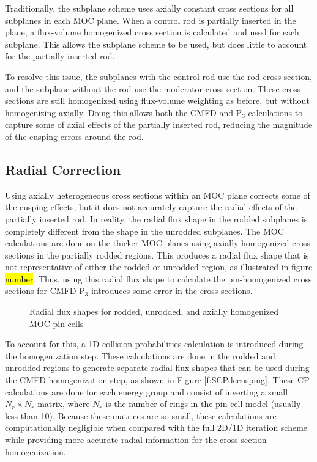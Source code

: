Traditionally, the subplane scheme uses axially constant cross sections for all subplanes in each MOC plane.  When a control rod is partially inserted in the plane, a flux-volume homogenized cross section is calculated and used for each subplane.  This allows the subplane scheme to be used, but does little to account for the partially inserted rod.

To resolve this issue, the subplanes with the control rod use the rod cross section, and the subplane without the rod use the moderator cross section.  These cross sections are still homogenized using flux-volume weighting as before, but without homogenizing axially.  Doing this allows both the CMFD and P$_3$ calculations to capture some of axial effects of the partially inserted rod, reducing the magnitude of the cusping errors around the rod.

\subsection{Radial Correction}

Using axially heterogeneous cross sections within an MOC plane corrects some of the cusping effects, but it does not accurately capture the radial effects of the partially inserted rod.  In reality, the radial flux shape in the rodded subplanes is completely different from the shape in the unrodded subplanes.  The MOC calculations are done on the thicker MOC planes using axially homogenized cross sections in the partially rodded regions.  This produces a radial flux shape that is not representative of either the rodded or unrodded region, as illustrated in figure \hl{number}.  Thus, using this radial flux shape to calculate the pin-homogenized cross sections for CMFD P$_3$ introduces some error in the cross sections.

\begin{figure}
    \centering
    \caption{Radial flux shapes for rodded, unrodded, and axially homogenized MOC pin cells}\label{f:radialFluxProfiles}
\end{figure}

To account for this, a 1D collision probabilities calculation is introduced during the homogenization step.  These calculations are done in the rodded and unrodded regions to generate separate radial flux shapes that can be used during the CMFD homogenization step, as shown in Figure \ref{f:SCPdecusping}.  These CP calculations are done for each energy group and consist of inverting a small $N_r \times N_r$ matrix, where $N_r$ is the number of rings in the pin cell model (usually less than 10).  Because these matrices are so small, these calculations are computationally negligible when compared with the full 2D/1D iteration scheme while providing more accurate radial information for the cross section homogenization.

